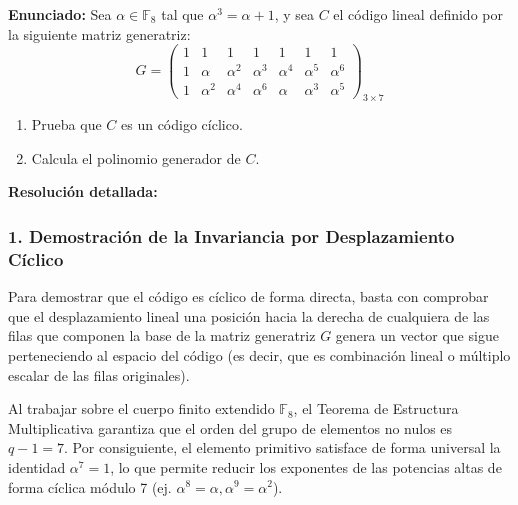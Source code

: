 \documentclass{article}
\begin{document}
\textbf{Enunciado:} Sea $\alpha \in \mathbb{F}_8$ tal que $\alpha^3 = \alpha + 1$, y sea $C$ el código lineal definido por la siguiente matriz generatriz:
\[
G = \begin{pmatrix}
1 & 1 & 1 & 1 & 1 & 1 & 1 \\
1 & \alpha & \alpha^2 & \alpha^3 & \alpha^4 & \alpha^5 & \alpha^6 \\
1 & \alpha^2 & \alpha^4 & \alpha^6 & \alpha & \alpha^3 & \alpha^5
\end{pmatrix}_{3 \times 7}
\]
\begin{enumerate}
    \item Prueba que $C$ es un código cíclico.
    \item Calcula el polinomio generador de $C$.
\end{enumerate}

\textbf{Resolución detallada:}

\subsubsection{1. Demostración de la Invariancia por Desplazamiento Cíclico}
Para demostrar que el código es cíclico de forma directa, basta con comprobar que el desplazamiento lineal una posición hacia la derecha de cualquiera de las filas que componen la base de la matriz generatriz $G$ genera un vector que sigue perteneciendo al espacio del código (es decir, que es combinación lineal o múltiplo escalar de las filas originales).

Al trabajar sobre el cuerpo finito extendido $\mathbb{F}_8$, el Teorema de Estructura Multiplicativa garantiza que el orden del grupo de elementos no nulos es $q-1 = 7$. Por consiguiente, el elemento primitivo satisface de forma universal la identidad $\alpha^7 = 1$, lo que permite reducir los exponentes de las potencias altas de forma cíclica módulo 7 (ej. $\alpha^8 = \alpha, \alpha^9 = \alpha^2$).
\end{document}
